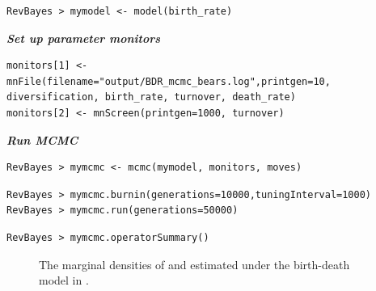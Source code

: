 {\tt \begin{snugshade*}
\begin{lstlisting}
RevBayes > mymodel <- model(birth_rate)
\end{lstlisting}
\end{snugshade*}}


\textbf{\textit{Set up parameter monitors}}


{\tt \begin{snugshade*}
\begin{lstlisting}
monitors[1] <- mnFile(filename="output/BDR_mcmc_bears.log",printgen=10, diversification, birth_rate, turnover, death_rate)
monitors[2] <- mnScreen(printgen=1000, turnover)
\end{lstlisting}
\end{snugshade*}}

\textbf{\textit{Run MCMC}}

{\tt \begin{snugshade*}
\begin{lstlisting}
RevBayes > mymcmc <- mcmc(mymodel, monitors, moves)
\end{lstlisting}
\end{snugshade*}}

{\tt \begin{snugshade*}
\begin{lstlisting}
RevBayes > mymcmc.burnin(generations=10000,tuningInterval=1000)
RevBayes > mymcmc.run(generations=50000)
\end{lstlisting}
\end{snugshade*}}

{\tt \begin{snugshade*}
\begin{lstlisting}
RevBayes > mymcmc.operatorSummary()
\end{lstlisting}
\end{snugshade*}}

\begin{figure}[h!]
\centering
{}
\caption{\small The marginal densities of  and  estimated under the birth-death model in \RevBayes.}
\label{tracerMarg}
\end{figure}

